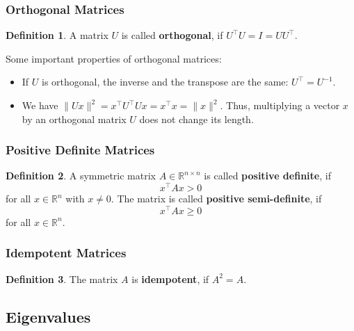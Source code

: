 \documentclass[
  a4paper,
]{article}
\theoremstyle{definition}
\newtheorem{definition}{Definition}[section]
\theoremstyle{definition}
\theoremstyle{definition}
\theoremstyle{definition}
\theoremstyle{remark}
\begin{document}
\hypertarget{orthogonal-matrices}{%
\subsubsection{Orthogonal Matrices}\label{orthogonal-matrices}}

\begin{definition}
A matrix \(U\) is called \textbf{orthogonal}, if \(U^\top U = I = U U^\top\).
\end{definition}

Some important properties of orthogonal matrices:

\begin{itemize}
\item
  If \(U\) is orthogonal, the inverse and the transpose are the same:
  \(U^\top = U^{-1}\).
\item
  We have \(\| U x \|^2 = x^\top U^\top U x = x^\top x = \| x \|^2\).
  Thus, multiplying a vector \(x\) by an orthogonal matrix \(U\) does
  not change its length.
\end{itemize}

\hypertarget{positive-definite}{%
\subsubsection{Positive Definite Matrices}\label{positive-definite}}

\begin{definition}
A symmetric matrix \(A \in \mathbb{R}^{n\times n}\) is called \textbf{positive definite}, if
\begin{equation*}
  x^\top A x > 0
\end{equation*}
for all \(x \in \mathbb{R}^n\) with \(x\neq 0\). The matrix is called
\textbf{positive semi-definite}, if
\begin{equation*}
  x^\top A x \geq 0
\end{equation*}
for all \(x \in \mathbb{R}^n\).
\end{definition}

\hypertarget{idempotent}{%
\subsubsection{Idempotent Matrices}\label{idempotent}}

\begin{definition}
The matrix \(A\) is \textbf{idempotent}, if \(A^2 = A\).
\end{definition}

\hypertarget{eigenvalues}{%
\subsection{Eigenvalues}\label{eigenvalues}}
\end{document}
